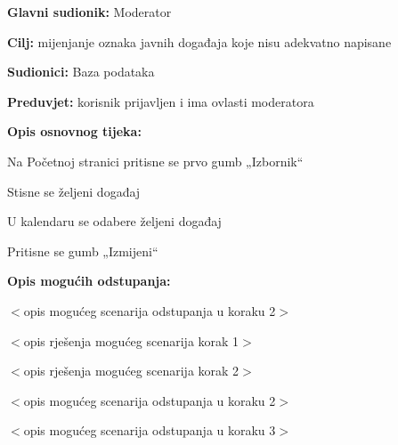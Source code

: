 	\noindent {}
\begin{packed_item}
	
	\item \textbf{Glavni sudionik: }Moderator
	\item  \textbf{Cilj:} mijenjanje oznaka javnih događaja koje nisu adekvatno napisane
	\item  \textbf{Sudionici:}
	Baza podataka
	\item  \textbf{Preduvjet:} korisnik prijavljen i ima ovlasti moderatora
	\item  \textbf{Opis osnovnog tijeka:}
	
	\item[] \begin{packed_enum}
		
		\item	Na Početnoj stranici pritisne se prvo gumb „Izbornik“
		\item	Stisne se željeni događaj
		\item	U kalendaru se odabere željeni događaj
		\item	Pritisne se gumb „Izmijeni“
		
	\end{packed_enum}
	
	\item  \textbf{Opis mogućih odstupanja:}
	
	\item[] \begin{packed_item}
		
		\item[2.a] $<$opis mogućeg scenarija odstupanja u koraku 2$>$
		\item[] \begin{packed_enum}
			
			\item $<$opis rješenja mogućeg scenarija korak 1$>$
			\item $<$opis rješenja mogućeg scenarija korak 2$>$
			
		\end{packed_enum}
		\item[2.b] $<$opis mogućeg scenarija odstupanja u koraku 2$>$
		\item[3.a] $<$opis mogućeg scenarija odstupanja  u koraku 3$>$
		
	\end{packed_item}
\end{packed_item}

